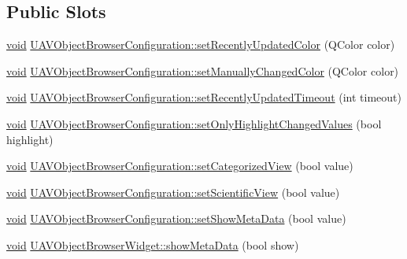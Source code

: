 \subsection*{\-Public \-Slots}
\begin{DoxyCompactItemize}
\item 
\hyperlink{group___u_a_v_objects_plugin_ga444cf2ff3f0ecbe028adce838d373f5c}{void} \hyperlink{group___u_a_v_object_browser_plugin_gaf53d59e82beee15d1cafdfe22d9fcac6}{\-U\-A\-V\-Object\-Browser\-Configuration\-::set\-Recently\-Updated\-Color} (\-Q\-Color color)
\item 
\hyperlink{group___u_a_v_objects_plugin_ga444cf2ff3f0ecbe028adce838d373f5c}{void} \hyperlink{group___u_a_v_object_browser_plugin_gab8f25b7b00cb2f219ac53627e4ae7fba}{\-U\-A\-V\-Object\-Browser\-Configuration\-::set\-Manually\-Changed\-Color} (\-Q\-Color color)
\item 
\hyperlink{group___u_a_v_objects_plugin_ga444cf2ff3f0ecbe028adce838d373f5c}{void} \hyperlink{group___u_a_v_object_browser_plugin_ga315e76c383270fc3ab6ec717ca0dd0e3}{\-U\-A\-V\-Object\-Browser\-Configuration\-::set\-Recently\-Updated\-Timeout} (int timeout)
\item 
\hyperlink{group___u_a_v_objects_plugin_ga444cf2ff3f0ecbe028adce838d373f5c}{void} \hyperlink{group___u_a_v_object_browser_plugin_gaf4d1a9bda21db2cc36ab4964ecb69fa4}{\-U\-A\-V\-Object\-Browser\-Configuration\-::set\-Only\-Highlight\-Changed\-Values} (bool highlight)
\item 
\hyperlink{group___u_a_v_objects_plugin_ga444cf2ff3f0ecbe028adce838d373f5c}{void} \hyperlink{group___u_a_v_object_browser_plugin_ga733d1a12782c0f87157f99566bde9e70}{\-U\-A\-V\-Object\-Browser\-Configuration\-::set\-Categorized\-View} (bool value)
\item 
\hyperlink{group___u_a_v_objects_plugin_ga444cf2ff3f0ecbe028adce838d373f5c}{void} \hyperlink{group___u_a_v_object_browser_plugin_gac72aa6686e16d9e653a7974c066cd345}{\-U\-A\-V\-Object\-Browser\-Configuration\-::set\-Scientific\-View} (bool value)
\item 
\hyperlink{group___u_a_v_objects_plugin_ga444cf2ff3f0ecbe028adce838d373f5c}{void} \hyperlink{group___u_a_v_object_browser_plugin_ga4105ee0a19a4196780e26ed03880f150}{\-U\-A\-V\-Object\-Browser\-Configuration\-::set\-Show\-Meta\-Data} (bool value)
\item 
\hyperlink{group___u_a_v_objects_plugin_ga444cf2ff3f0ecbe028adce838d373f5c}{void} \hyperlink{group___u_a_v_object_browser_plugin_ga96e35f04d563b34d393bcd810423910d}{\-U\-A\-V\-Object\-Browser\-Widget\-::show\-Meta\-Data} (bool show)

\end{DoxyCompactItemize}
